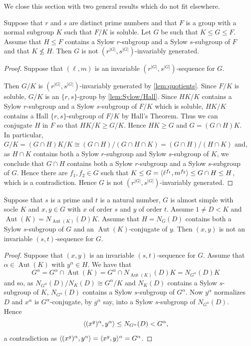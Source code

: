 \documentclass[12pt,a4paper]{amsart}
\DeclareMathOperator{\Aut}{Aut}
\DeclarePairedDelimiter{\gen}{\langle}{\rangle}
\begin{document}
We close this section with two general results which do  not fit elsewhere.

\begin{lemma}\label{lem:contain r and s subgroups} Suppose that $r$ and $s$ are distinct  prime numbers and that $F$ is a group with a normal subgroup $K$ such that $F/K$ is soluble. Let $G$ be such that $K \le G \le F$. Assume that $H\le F$  contains a Sylow $r$-subgroup and a Sylow $s $-subgroup of $F$ and that $ K   \not \le H$. Then $G$ is not  $(r^{|G|},s^{|G|})$-invariably generated.
\end{lemma}

\begin{proof} Suppose that $(\ell,m)$ is an invariable $(r^{|G|},s^{|G|})$-sequence for $G$.

  Then $G/K$ is $(r^{|G|},s^{|G|})$-invariably generated by \cref{lem:quotients}. Since $F/K$ is soluble, $G/K$ is  an $\{r,s\}$-group by \cref{lem:Sylow/Hall}. Since $HK/K$ contains a Sylow $r$-subgroup and a Sylow $s$-subgroup of $F/K$ which is soluble, $HK/K$ contains a Hall $\{r,s\}$-subgroup of $F/K$  by Hall's Theorem. Thus we can conjugate $H$ in $F$ so that $HK/K \ge G/K$.  Hence $HK \ge G$ and $G= (G \cap H)K$. In particular, $G/K= (G \cap H)K/K\cong (G\cap H)/(G\cap H \cap K)=(G\cap H)/(H\cap  K)$ and, as $H \cap K$ contains both a Sylow $r$-subgroup and Sylow $s$-subgroup of $K$, we conclude that $G\cap H$ contains both a Sylow $r$-subgroup and a Sylow $s$-subgroup of $G$. Hence there are $f_1,f_2\in G$ such that $K\le G=\gen{\ell^{f_1}, m^{f_2}}\le G\cap H\le H$, which is a contradiction. Hence $G$ is not  $(r^{|G|},s^{|G|})$-invariably generated.
\end{proof}


\begin{lemma}\label{lem:lastlem}
Suppose that $s$ is a prime  and $t$ is a natural number, $G$ is almost simple with socle $K$ and    $x,y\in G$ with $x$ of order $s$ and $y$ of order $t$. Assume   $1\ne D < K$ and $\Aut(K) =N_{\Aut(K)}(D) K$.  Assume that $H= N_G(D)$  contains both a Sylow $s$-subgroup of $G$ and an $\Aut(K)$-conjugate of $y$.  Then $(x,y)$ is not an invariable $(s,t)$-sequence for $G$.
\end{lemma}

\begin{proof} Suppose that $(x,y)$ is an invariable $(s,t)$-sequence for $G$. Assume that $\alpha \in \Aut(K)$ with $y^\alpha \in H$.
  We have that $$G^\alpha = G^\alpha\cap \Aut(K)= G^\alpha\cap N_{\Aut(K)}(D) K=  N_{G^\alpha}(D)K$$ and so, as $N_{G^\alpha}(D)/N_K(D)\cong G^\alpha/K$ and $N_K(D)$ contains a Sylow $s$-subgroup of $K$, $N_{G^\alpha}(D)$ contains a Sylow $s$-subgroup of $G^\alpha$.
Now $y^\alpha$ normalizes $D$ and $x^\alpha$ is $G^\alpha$-conjugate, by $g^\alpha$ say, into a Sylow $s$-subgroup of $N_{G^\alpha}(D)$.
Hence $$\gen{(x^g)^\alpha,y^\alpha} \le N_{G^\alpha}(D) < G^\alpha,$$ a contradiction as $\gen{(x^g)^\alpha,y^\alpha}=  \gen{x^g ,y}^\alpha=G^\alpha$.
\end{proof}
\end{document}
